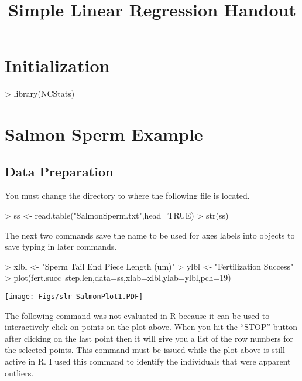 \documentclass[a4paper]{article}
\begin{document}
\title{Simple Linear Regression Handout}
\date{}  %
\maketitle
\vspace{-72pt}


\section{Initialization} \label{sect:Inits}
\begin{Schunk}
\begin{Sinput}
> library(NCStats)
\end{Sinput}
\end{Schunk}

\section{Salmon Sperm Example}
\subsection{Data Preparation}
You must change the directory to where the following file is located.
\begin{Schunk}
\begin{Sinput}
> ss <- read.table("SalmonSperm.txt",head=TRUE)
> str(ss)
\end{Sinput}
\end{Schunk}

The next two commands save the name to be used for axes labels into objects to save typing in later commands.
\begin{Schunk}
\begin{Sinput}
> xlbl <- "Sperm Tail End Piece Length (um)"
> ylbl <- "Fertilization Success"
> plot(fert.succ~step.len,data=ss,xlab=xlbl,ylab=ylbl,pch=19)
\end{Sinput}
\end{Schunk}
\texttt{[image: Figs/slr-SalmonPlot1.PDF]}

The following command was not evaluated in R because it can be used to interactively click on points on the plot above.  When you hit the ``STOP'' button after clicking on the last point then it will give you a list of the row numbers for the selected points.  This command must be issued while the plot above is still active in R.  I used this command to identify the individuals that were apparent outliers.
\end{document}
